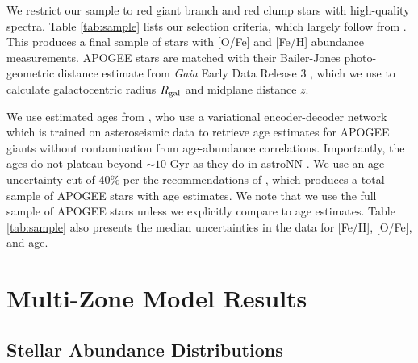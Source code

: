 \documentclass[twocolumn,twocolappendix,linenumbers]{aastex631}
\begin{document}
We restrict our sample to red giant branch and red clump stars with high-quality spectra. Table \ref{tab:sample} lists our selection criteria, which largely follow from \citet{Hayden2015-ChemicalCartography}. This produces a final sample of stars with [O/Fe] and [Fe/H] abundance measurements. APOGEE stars are matched with their Bailer-Jones photo-geometric distance estimate from \textit{Gaia} Early Data Release 3 \citep{gaia_collaboration_gaia_2016,gaia_collaboration_gaia_2021}, which we use to calculate galactocentric radius $R_{\rm gal}$ and midplane distance $z$.

We use estimated ages from \citet[][hereafter ]{leung_variational_2023}, who use a variational encoder-decoder network which is trained on asteroseismic data to retrieve age estimates for APOGEE giants without contamination from age-abundance correlations. Importantly, the  ages do not plateau beyond $\sim10$ Gyr as they do in astroNN \citep{Mackereth2019-astroNN-Ages}. We use an age uncertainty cut of 40\% per the recommendations of , which produces a total sample of APOGEE stars with age estimates. We note that we use the full sample of APOGEE stars unless we explicitly compare to age estimates. Table \ref{tab:sample} also presents the median uncertainties in the data for [Fe/H], [O/Fe], and age.

\section{Multi-Zone Model Results}
\label{sec:multizone-results}

\subsection{Stellar Abundance Distributions}
\end{document}

